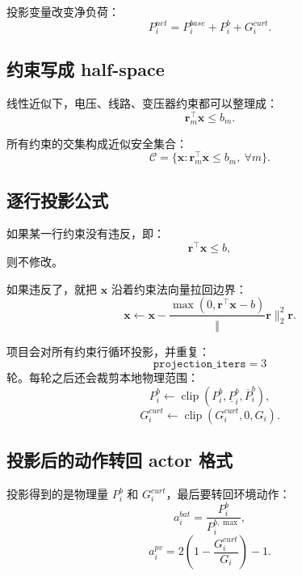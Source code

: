 \documentclass[UTF8,zihao=-4]{ctexart}
\begin{document}
投影变量改变净负荷：
\begin{equation}
P^{net}_i=P^{base}_i+P^b_i+G^{curt}_i.
\end{equation}

\subsection{约束写成 half-space}

线性近似下，电压、线路、变压器约束都可以整理成：
\begin{equation}
\bm r_m^\top\bm x\le b_m.
\end{equation}

所有约束的交集构成近似安全集合：
\begin{equation}
\mathcal{C}
=
\{\bm x:\bm r_m^\top\bm x\le b_m,\ \forall m\}.
\end{equation}

\subsection{逐行投影公式}

如果某一行约束没有违反，即：
\begin{equation}
\bm r^\top\bm x\le b,
\end{equation}
则不修改。

如果违反了，就把 $\bm x$ 沿着约束法向量拉回边界：
\begin{equation}
\bm x
\leftarrow
\bm x
-
\frac{
\max(0,\bm r^\top\bm x-b)
}
\|\bm r\|_2^2
\bm r.
\end{equation}

项目会对所有约束行循环投影，并重复：
\begin{equation}
\texttt{projection\_iters}=3
\end{equation}
轮。每轮之后还会裁剪本地物理范围：
\begin{equation}
P^b_i\leftarrow
\operatorname{clip}(P^b_i,\underline P^b_i,\overline P^b_i),
\end{equation}
\begin{equation}
G^{curt}_i\leftarrow
\operatorname{clip}(G^{curt}_i,0,G_i).
\end{equation}

\subsection{投影后的动作转回 actor 格式}

投影得到的是物理量 $P^b_i$ 和 $G^{curt}_i$，最后要转回环境动作：
\begin{equation}
a^{bat}_i=\frac{P^b_i}{P^{b,\max}_i},
\end{equation}
\begin{equation}
a^{pv}_i
=
2\left(1-\frac{G^{curt}_i}{G_i}\right)-1.
\end{equation}
\end{document}
